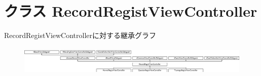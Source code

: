 \hypertarget{interface_record_regist_view_controller}{
\section{クラス RecordRegistViewController}
\label{interface_record_regist_view_controller}
}
RecordRegistViewControllerに対する継承グラフ\begin{figure}[H]
\begin{center}
\leavevmode
\includegraphics[height=1.419518cm]{interface_record_regist_view_controller}
\end{center}
\end{figure}
